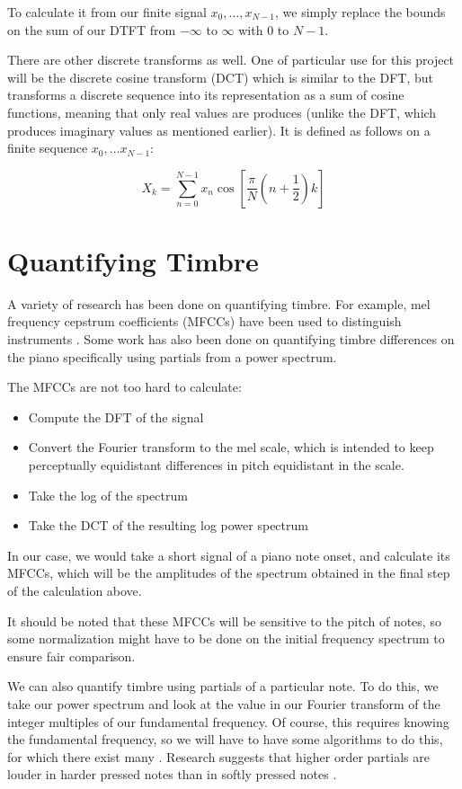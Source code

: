 \documentclass[12pt]{article}
\begin{document}
To calculate it from our finite signal $x_0, \ldots, x_{N-1}$, we simply replace the bounds on the sum of our DTFT from $-\infty$ to $\infty$ with $0$ to $N-1$.

There are other discrete transforms as well. One of particular use for this project will be the discrete cosine transform (DCT) which is similar to the DFT, but transforms a discrete sequence into its representation as a sum of cosine functions, meaning that only real values are produces (unlike the DFT, which produces imaginary values as mentioned earlier). It is defined as follows on a finite sequence $x_0, \ldots x_{N-1}$:

\[
    X_k = \sum_{n=0}^{N-1} x_n\cos \left[ \frac{\pi}{N}\left(n + \frac{1}{2}\right)k\right]
\] 

\section{Quantifying Timbre}

A variety of research has been done on quantifying timbre. For example, mel frequency cepstrum coefficients (MFCCs) have been used to distinguish instruments \cite{mfcc}. Some work has also been done on quantifying timbre differences on the piano specifically \cite{pianotimbre} using partials from a power spectrum.

The MFCCs are not too hard to calculate:

\begin{itemize}
    \item
        Compute the DFT of the signal
       
    \item
        Convert the Fourier transform to the mel scale, which is intended to keep perceptually equidistant differences in pitch equidistant in the scale.

    \item
        Take the log of the spectrum

    \item
        Take the DCT of the resulting log power spectrum
\end{itemize}

In our case, we would take a short signal of a piano note onset, and calculate its MFCCs, which will be the amplitudes of the spectrum obtained in the final step of the calculation above.

It should be noted that these MFCCs will be sensitive to the pitch of notes, so some normalization might have to be done on the initial frequency spectrum to ensure fair comparison.

We can also quantify timbre using partials of a particular note. To do this, we take our power spectrum and look at the value in our Fourier transform of the integer multiples of our fundamental frequency. Of course, this requires knowing the fundamental frequency, so we will have to have some algorithms to do this, for which there exist many \cite{pitchdetectionreview}. Research suggests that higher order partials are louder in harder pressed notes than in softly pressed notes \cite{pianotimbre}.








\printbibliography
\end{document}
